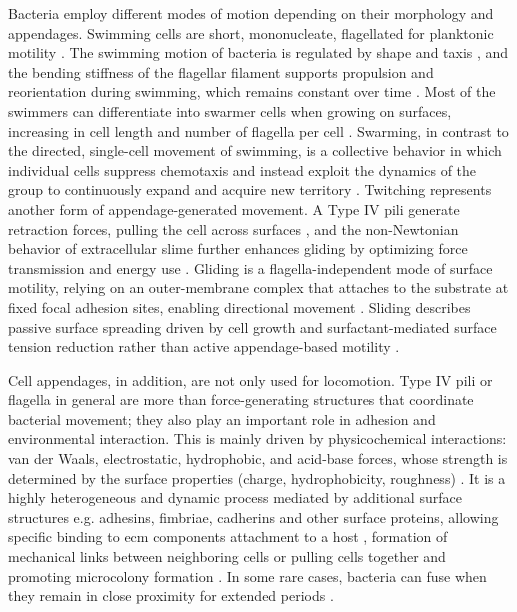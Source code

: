 Bacteria employ different modes of motion depending on their morphology and appendages.
Swimming cells are short, mononucleate, flagellated for planktonic motility
\cite{Alberti1990}. The swimming motion of bacteria is regulated by shape and taxis
\cite{Kong2014}, and the bending stiffness of the flagellar filament supports propulsion
and reorientation during swimming, which remains constant over time \cite{Shen2022}. Most
of the swimmers can differentiate into swarmer cells when growing on surfaces, increasing
in cell length and number of flagella per cell \cite{Alberti1990, Harshey1994}.
Swarming, in contrast to the directed, single-cell movement of swimming, is a collective
behavior in which individual cells suppress chemotaxis and instead exploit the dynamics
of the group to continuously expand and acquire new territory \cite{Harshey2015, Kearns2010}.
Twitching represents another form of appendage-generated movement. A Type IV pili
generate retraction forces, pulling the cell across surfaces \cite{Chang2016}, and the
non-Newtonian behavior of extracellular slime further enhances gliding by optimizing
force transmission and energy use \cite{Shah2022}.
Gliding is a flagella-independent mode of surface motility, relying on an outer-membrane
complex that attaches to the substrate at fixed focal adhesion sites, enabling
directional movement \cite{ContrerasM2024, Shrivastava2015}.
Sliding describes passive surface spreading driven by cell growth and surfactant-mediated
surface tension reduction rather than active appendage-based motility \cite{Kearns2010}.

Cell appendages, in addition, are not only used for locomotion. Type IV pili
\cite{Ellison2021, Maier2015} or flagella in general \cite{Haiko2013} are more than
force-generating structures that coordinate bacterial movement; they also play an
important role in adhesion and environmental interaction. This is mainly driven by
physicochemical interactions: van der Waals, electrostatic, hydrophobic, and acid-base
forces, whose strength is determined by the surface properties (charge, hydrophobicity,
roughness) \cite{vanLoosdrecht1989, Hori2010}. It is a highly heterogeneous and dynamic
process mediated by additional surface structures e.g. adhesins, fimbriae, cadherins and
other surface proteins, allowing specific binding to \ac{ecm} components
\cite{BrettFinlay2014, Berne2018} attachment to a host \cite{Beachey1981, Vaca2019},
formation of mechanical links between neighboring cells \cite{Whitfield2006} or pulling
cells together and promoting microcolony formation \cite{Ellison2021}. In some rare
cases, bacteria can fuse when they remain in close proximity for extended periods
\cite{Kudryashev2011}.

